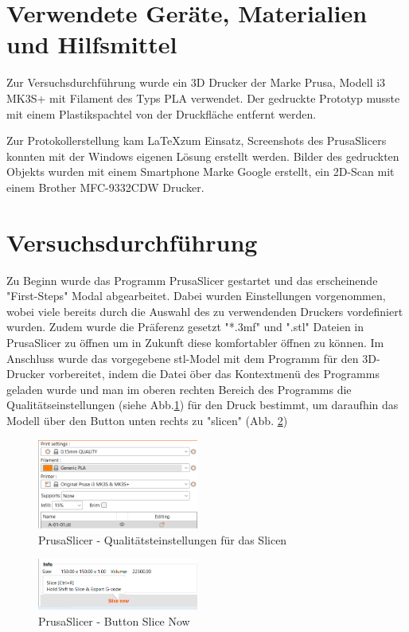 \documentclass[a4paper,12pt,bibtotocnumbered]{scrartcl}
\numberwithin{equation}{section} %
\begin{document}
\section[Verwendete Geräte, Materialien und Hilfsmittel]{Verwendete Geräte, Materialien und Hilfsmittel}

Zur Versuchsdurchführung wurde ein 3D Drucker der Marke Prusa, Modell i3 MK3S+ mit Filament des Typs PLA verwendet. Der gedruckte Prototyp musste mit einem Plastikspachtel von der Druckfläche entfernt werden.

Zur Protokollerstellung kam \LaTeX\;zum Einsatz, Screenshots des PrusaSlicers konnten mit der Windows eigenen Lösung erstellt werden. Bilder des gedruckten Objekts wurden mit einem Smartphone Marke Google erstellt, ein 2D-Scan mit einem Brother MFC-9332CDW Drucker.

\section[Versuchsdurchführung]{Versuchsdurchführung}

Zu Beginn wurde das Programm PrusaSlicer gestartet und das erscheinende "First-Steps" Modal abgearbeitet. Dabei wurden Einstellungen vorgenommen, wobei viele bereits durch die Auswahl des zu verwendenden Druckers vordefiniert wurden. Zudem wurde die Präferenz gesetzt "*.3mf" und ".stl" Dateien in PrusaSlicer zu öffnen um in Zukunft diese komfortabler öffnen zu können.
Im Anschluss wurde das vorgegebene stl-Model mit dem Programm für den 3D-Drucker vorbereitet, indem die Datei öber das Kontextmenü des Programms geladen wurde und man im oberen rechten Bereich des Programms die Qualitätseinstellungen (siehe Abb.\ref*{quality_settings}) für den Druck bestimmt, um daraufhin das Modell über den Button unten rechts zu "slicen" (Abb. \ref*{slice_now})


\begin{figure}[htbp]
\centerline{\includegraphics[width=200px]{./images/print_settings.png}}
\caption{PrusaSlicer - Qualitätsteinstellungen für das Slicen}
\label{quality_settings}
\end{figure}

\begin{figure}[htbp]
\centerline{\includegraphics[width=200px]{./images/slice_now.png}}
\caption{PrusaSlicer - Button Slice Now}
\label{slice_now}
\end{figure}
\end{document}
